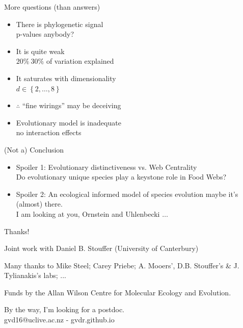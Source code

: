 \documentclass[]{beamer}
\begin{document}
\begin{frame}{More questions (than answers)}

\begin{itemize}[<+->]
\itemsep1pt\parskip0pt
\item
  There is phylogenetic signal\\
  {\tiny p-values anybody?}
\item
  It is quite weak\\
  {\tiny $20\% ~ 30\%$ of variation explained}
\item
  It saturates with dimensionality\\
  {\tiny $d \in \left\{2, \dots , 8 \right\}$}
\item
  $\therefore$ ``fine wirings'' may be deceiving
\item
  Evolutionary model is inadequate\\
  {\tiny no interaction effects}
\end{itemize}

\end{frame}

\begin{frame}{(Not a) Conclusion}

\begin{itemize}[<+->]
\item
  Spoiler 1: Evolutionary distinctiveness vs. Web Centrality\\
  {\small Do evolutionary unique species play a keystone role in Food Webs?}
\item
  Spoiler 2: An ecological informed model of species evolution maybe
  it's (almost) there.\\
  {\small I am looking at you, Ornstein and Uhlenbecki $\dots$}
\end{itemize}

\end{frame}

\begin{frame}{Thanks!}

\begin{centering}

Joint work with  
Daniel B. Stouffer (University of Canterbury)

Many thanks to  
Mike Steel; Carey Priebe; A. Mooers', D.B. Stouffer's \& J. Tylianakis's labs; ...

Funds by the Allan Wilson Centre for Molecular Ecology and Evolution.

\vspace{2cm}

\small{By the way, I'm looking for a postdoc.\\ gvd16@uclive.ac.nz - gvdr.github.io}

\end{centering}

\end{frame}
\end{document}
